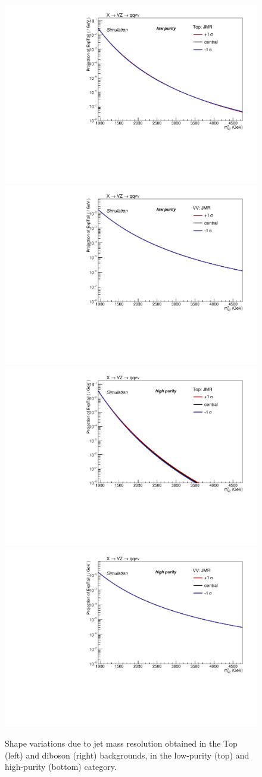  \begin{figure}[!htb]
   \begin{center}
     \includegraphics[width=.495\textwidth]{plotsAlpha_tesi/XVZnnlp/SysTop_JMR.pdf}
     \includegraphics[width=.495\textwidth]{plotsAlpha_tesi/XVZnnlp/SysVV_JMR.pdf}
     \\
     \includegraphics[width=.495\textwidth]{plotsAlpha_tesi/XVZnnhp/SysTop_JMR.pdf}
     \includegraphics[width=.495\textwidth]{plotsAlpha_tesi/XVZnnhp/SysVV_JMR.pdf}

   \end{center}
   \caption{Shape variations due to jet mass resolution obtained in the Top (left) and diboson (right) backgrounds, in the low-purity (top) and high-purity (bottom) category.}
   \label{fig:sysJMR}
 \end{figure}

